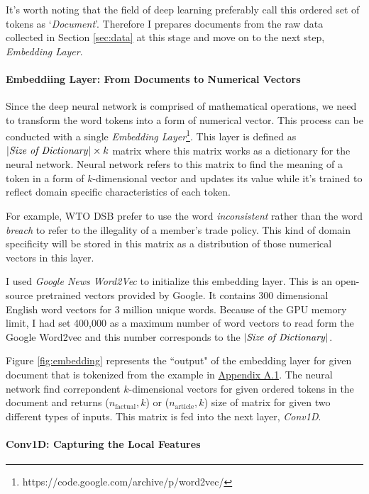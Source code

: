 \documentclass[12pt,letterpaper]{article}
\begin{document}
It's worth noting that the field of deep learning preferably call this ordered set of tokens as `\textit{Document}'.
Therefore I prepares documents from the raw data collected in Section \ref{sec:data} at this stage and move on to the next step, \textit{Embedding Layer}.


\paragraph{Embeddiing Layer: From Documents to Numerical Vectors}

Since the deep neural network is comprised of mathematical operations, 
we need to transform the word tokens into a form of numerical vector. 
This process can be conducted with a single \textit{Embedding Layer}\footnote{https://code.google.com/archive/p/word2vec/}. %
This layer is defined as $|\text{\textit{Size of Dictionary}}| \times k $ matrix where this matrix works as a dictionary for the neural network.
Neural network refers to this matrix to find the meaning of a token in a form of $k$-dimensional vector and updates its value while it's trained to
reflect domain specific characteristics of each token.

For example, WTO DSB prefer to use the word \textit{inconsistent} rather than the word \textit{breach} to refer to the illegality of a member's trade policy.
This kind of domain specificity will be stored in this matrix as a distribution of those numerical vectors in this layer. 

I used \textit{Google News Word2Vec} to initialize this embedding layer. This is an open-source pretrained vectors provided by Google. It contains 300 dimensional English word vectors for 3 million unique words. Because of the GPU memory limit, I had set 400,000 as a maximum number of word vectors to read form the Google Word2vec and this number corresponds to the $|\text{\textit{Size of Dictionary}}|$.

Figure \ref{fig:embedding} represents the ``output" of the embedding layer for given document that is tokenized 
from the example in \hyperref[sub:factual-aspect-example]{Appendix A.1}. 
The neural network find correpondent $k$-dimensional vectors for given ordered tokens in the document and returns ($n_{\text{factual}}, k$) or ($n_{\text{article}}, k$) size of matrix for given two different types of inputs.
This matrix is fed into the next layer, \textit{Conv1D}.


\paragraph{Conv1D: Capturing the Local Features}
\end{document}
